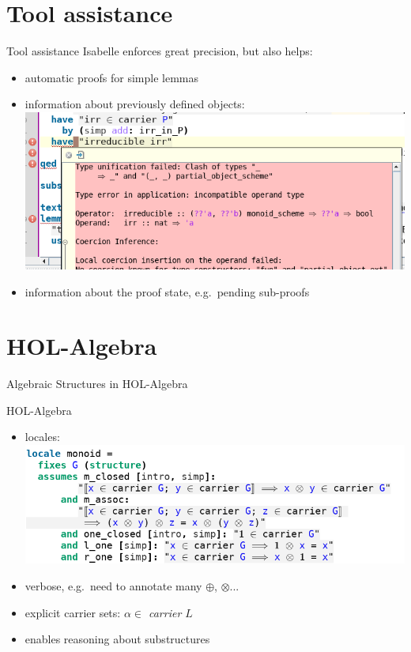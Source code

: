 \documentclass[%
	sans,
	12pt,
]{beamer}
\newcommand{\high}[1]{{\usebeamercolor[fg]{structure} #1}}
\begin{document}
\section{Tool assistance}
\begin{frame}{Tool assistance}%
Isabelle enforces great precision, but also helps:
\begin{itemize}
	\item automatic proofs for simple lemmas\pause %
	\item information about previously defined objects: \pause
	\includegraphics[width=0.7\linewidth]{"type_error"} \pause
	\item information about the proof state, e.g.\ pending sub-proofs
\end{itemize}
\end{frame}

\section{HOL-Algebra}
\begin{frame}
\begin{center}
\huge\high{Algebraic Structures in HOL-Algebra}%
\end{center}
\end{frame}

\begin{frame}{HOL-Algebra}
\begin{itemize}
	\item locales:
	\includegraphics[width=\linewidth]{"locale_monoid"}
	\pause
	\item verbose, e.g.\ need to annotate many $\oplus$, $\otimes$... \pause
	\item explicit carrier sets: \textit{$\alpha \in$ carrier $L$} \pause
	\item enables reasoning about substructures	%
\end{itemize}
\end{frame}
\end{document}
